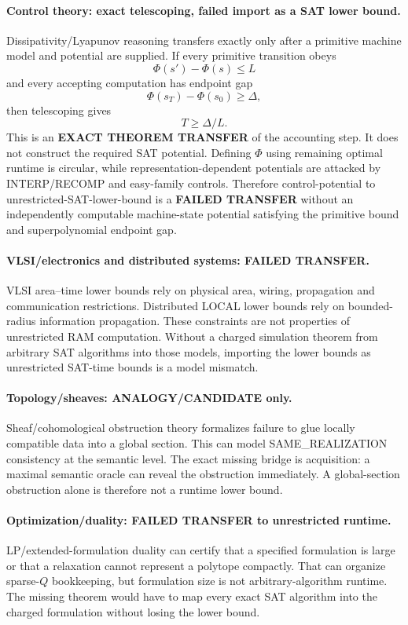 \documentclass[11pt]{article}
\begin{document}
\paragraph{Control theory: exact telescoping, failed import as a SAT lower bound.}
Dissipativity/Lyapunov reasoning transfers exactly only after a primitive machine model and potential are supplied. If every primitive transition obeys
\[
\Phi(s')-\Phi(s)\le L
\]
and every accepting computation has endpoint gap
\[
\Phi(s_T)-\Phi(s_0)\ge\Delta,
\]
then telescoping gives
\[
T\ge \Delta/L.
\]
This is an \textbf{EXACT THEOREM TRANSFER} of the accounting step. It does not construct the required SAT potential. Defining $\Phi$ using remaining optimal runtime is circular, while representation-dependent potentials are attacked by INTERP/RECOMP and easy-family controls. Therefore control-potential to unrestricted-SAT-lower-bound is a \textbf{FAILED TRANSFER} without an independently computable machine-state potential satisfying the primitive bound and superpolynomial endpoint gap.

\paragraph{VLSI/electronics and distributed systems: FAILED TRANSFER.}
VLSI area--time lower bounds rely on physical area, wiring, propagation and communication restrictions. Distributed LOCAL lower bounds rely on bounded-radius information propagation. These constraints are not properties of unrestricted RAM computation. Without a charged simulation theorem from arbitrary SAT algorithms into those models, importing the lower bounds as unrestricted SAT-time bounds is a model mismatch.

\paragraph{Topology/sheaves: ANALOGY/CANDIDATE only.}
Sheaf/cohomological obstruction theory formalizes failure to glue locally compatible data into a global section. This can model SAME\_REALIZATION consistency at the semantic level. The exact missing bridge is acquisition: a maximal semantic oracle can reveal the obstruction immediately. A global-section obstruction alone is therefore not a runtime lower bound.

\paragraph{Optimization/duality: FAILED TRANSFER to unrestricted runtime.}
LP/extended-formulation duality can certify that a specified formulation is large or that a relaxation cannot represent a polytope compactly. That can organize sparse-$Q$ bookkeeping, but formulation size is not arbitrary-algorithm runtime. The missing theorem would have to map every exact SAT algorithm into the charged formulation without losing the lower bound.
\end{document}
